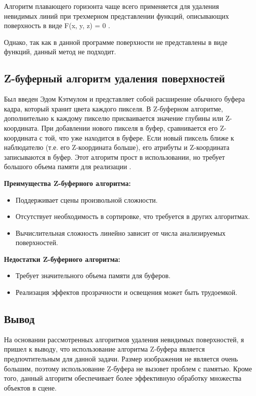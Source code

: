 Алгоритм плавающего горизонта чаще всего применяется для удаления невидимых линий при трехмерном представлении функций, описывающих поверхность в виде F(x, y, z) = 0 \cite{del_line}.

Однако, так как в данной программе поверхности не представлены в виде функций, данный метод не подходит.

\subsection{Z-буферный алгоритм удаления поверхностей}

Был введен Эдом Кэтмулом и представляет собой расширение обычного буфера кадра, который хранит цвета каждого пикселя. В Z-буферном алгоритме, дополнительно к каждому пикселю присваивается значение глубины или Z-координата. При добавлении нового пикселя в буфер, сравнивается его Z-координата с той, что уже находится в буфере. Если новый пиксель ближе к наблюдателю (т.е. его Z-координата больше), его атрибуты и Z-координата записываются в буфер. Этот алгоритм прост в использовании, но требует большого объема памяти для реализации \cite{del_line}. 
    
\textbf{Преимущества Z-буферного алгоритма:}
\begin{itemize}
\item Поддерживает сцены произвольной сложности.
\item Отсутствует необходимость в сортировке, что требуется в других алгоритмах.
\item Вычислительная сложность линейно зависит от числа анализируемых поверхностей.
\end{itemize}

\textbf{Недостатки Z-буферного алгоритма:}
\begin{itemize}
\item Требует значительного объема памяти для буферов.
\item Реализация эффектов прозрачности и освещения может быть трудоемкой.
\end{itemize}

 
\subsection{Вывод}

 На основании рассмотренных алгоритмов удаления невидимых поверхностей, я пришел к выводу, что использование алгоритма Z-буфера является предпочтительным для данной задачи. Размер изображения не является очень большим, поэтому использование Z-буфера не вызовет проблем с памятью. Кроме того, данный алгоритм обеспечивает более эффективную обработку множества объектов в сцене.

